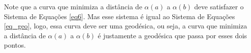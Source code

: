 \documentclass{article}
\begin{document}
Note que a curva que minimiza a distância de $\alpha(a)$ a $\alpha(b)$ deve satisfazer o Sistema de Equações \ref{eq6}. Mas esse sistema é igual ao Sistema de Equações \ref{eq_geo}, logo, essa curva deve ser uma geodésica, ou seja, a curva que minimiza a distância de $\alpha(a)$ a $\alpha(b)$ é justamente a geodésica que passa por esses dois pontos.








\end{document}
